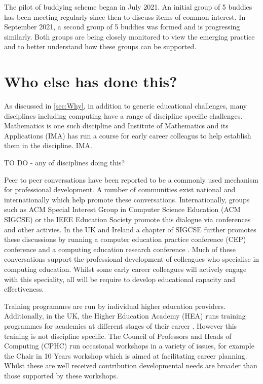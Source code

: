 \documentclass[sigconf]{acmart}
\begin{document}
\begin{comment}
To DO - evaluation of Buddying - PH what is needed here? Is sufficient to indicate the first pilot of 10 buddies has been established? Or do we need feedback from the participants?
\end{comment}

The pilot of buddying scheme began in July 2021. An initial group of 5 buddies has been meeting regularly since then to discuss items of common interest. In September 2021, a second group of 5 buddies was formed and is progressing similarly. Both groups are being closely monitored to view the emerging practice and to better understand how these groups can be supported.


\section{Who else has done this?}
As discussed in \ref{sec:Why}, in addition to generic educational challenges, many disciplines including computing have a range of discipline specific challenges. Mathematics is one such discipline and Institute of Mathematics and its Applications (IMA) has run a course for early career colleagus to help establish them in the discipline. {IMA}.

TO DO - any of disciplines doing this?

Peer to peer conversations have been reported to be a commonly used mechanism for professional development\cite{King2004}. A number of communities exist national and internationally which help promote these conversations. Internationally, groups such as ACM Special Interest Group in Computer Science Education (ACM SIGCSE) \cite{SIGCSE} or the IEEE Education Society \cite{IEEEES} promote this dialogue via conferences and other activies.  In the UK and Ireland a chapter of SIGCSE \cite{UKI-SIGCSE} further promotes these discussions by running a computer education practice conference (CEP) conference \cite{CEP} and a computing education research conference \cite{UKICER}. Much of these conversations support the professional development of colleagues who specialise in computing education. Whilst some early career colleagues will actively engage with this speciality, all will be require to develop educational capacity and effectiveness.
 
Training programmes are run by individual higher education providers. Additionally, in the UK, the Higher Education Academy (HEA) runs training programmes for academics at different stages of their career \cite{HEATraining}. However this training is not discipline specific. The Council of Professors and Heads of Computing (CPHC) run occasional workshops in a variety of issues, for example the Chair in 10 Years workshop which is aimed at facilitating career planning. Whilst these are well received contribution developmental needs are broader than those supported by these workshops.
\end{document}
